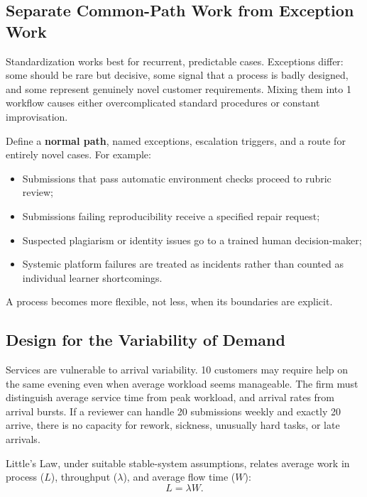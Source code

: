 \subsection{Separate Common-Path Work from Exception Work}
\label{sec:common_vs_exception}

Standardization works best for recurrent, predictable cases. Exceptions differ: some should be rare but decisive, some signal that a process is badly designed, and some represent genuinely novel customer requirements. Mixing them into 1 workflow causes either overcomplicated standard procedures or constant improvisation.

Define a \textbf{normal path}, named exceptions, escalation triggers, and a route for entirely novel cases. For example:
\begin{itemize}
    \item Submissions that pass automatic environment checks proceed to rubric review;
    \item Submissions failing reproducibility receive a specified repair request;
    \item Suspected plagiarism or identity issues go to a trained human decision-maker;
    \item Systemic platform failures are treated as incidents rather than counted as individual learner shortcomings.
\end{itemize}

A process becomes more flexible, not less, when its boundaries are explicit.

\subsection{Design for the Variability of Demand}
\label{sec:variability_of_demand}

Services are vulnerable to arrival variability. 10 customers may require help on the same evening even when average workload seems manageable. The firm must distinguish average service time from peak workload, and arrival rates from arrival bursts. If a reviewer can handle 20 submissions weekly and exactly 20 arrive, there is no capacity for rework, sickness, unusually hard tasks, or late arrivals.

Little's Law, under suitable stable-system assumptions, relates average work in process ($L$), throughput ($\lambda$), and average flow time ($W$):
\begin{equation}
L = \lambda W.
\end{equation}

